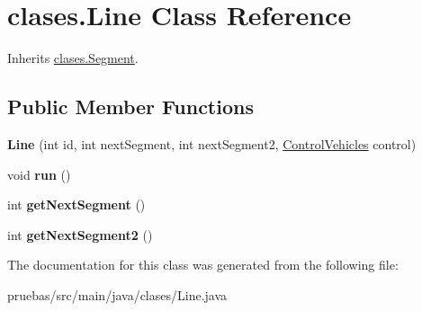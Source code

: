 \hypertarget{classclases_1_1_line}{}\section{clases.\+Line Class Reference}
\label{classclases_1_1_line}


Inherits \mbox{\hyperlink{classclases_1_1_segment}{clases.\+Segment}}.

\subsection*{Public Member Functions}
\begin{DoxyCompactItemize}
\item 
\mbox{\label{classclases_1_1_line_a77b02132b68c73e6f59e04b76aebcefc}} 
{\bfseries Line} (int id, int next\+Segment, int next\+Segment2, \mbox{\hyperlink{classcontrol_1_1_control_vehicles}{Control\+Vehicles}} control)
\item 
\mbox{\label{classclases_1_1_line_a5746922f975ee20fc0cbe9533f97a1db}} 
void {\bfseries run} ()
\item 
\mbox{\label{classclases_1_1_line_a59a8aaaed373c81611fe1f003012d0bd}} 
int {\bfseries get\+Next\+Segment} ()
\item 
\mbox{\label{classclases_1_1_line_af330f196c35a61d78325b45a8b590357}} 
int {\bfseries get\+Next\+Segment2} ()
\end{DoxyCompactItemize}


The documentation for this class was generated from the following file\+:\begin{DoxyCompactItemize}
\item 
pruebas/src/main/java/clases/Line.\+java\end{DoxyCompactItemize}
